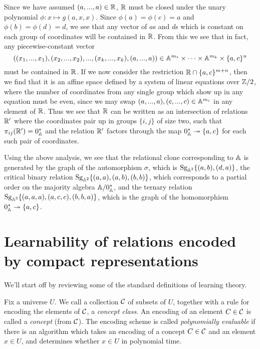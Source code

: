 \documentclass[letterpaper,11pt]{article}
\DeclareMathOperator{\Sg}{Sg}
\begin{document}
\begin{ex}
Since we have assumed $(a,...,a) \in \mathbb{R}$, $\mathbb{R}$ must be closed under the unary polynomial $\phi : x \mapsto g(a,x,x)$. Since $\phi(a) = \phi(c) = a$ and $\phi(b) = \phi(d) = d$, we see that any vector of $a$s and $d$s which is constant on each group of coordinates will be contained in $\mathbb{R}$. From this we see that in fact, any piecewise-constant vector
\[
((x_1,...,x_1),(x_2,...,x_2), ..., (x_k, ..., x_k), (a,...,a)) \in \mathbb{A}^{m_1} \times \cdots \times \mathbb{A}^{m_k} \times \{a,c\}^n
\]
must be contained in $\mathbb{R}$. If we now consider the restriction $\mathbb{R} \cap \{a,c\}^{m+n}$, then we find that it is an affine space defined by a system of linear equations over $\mathbb{Z}/2$, where the number of coordinates from any single group which show up in any equation must be even, since we may swap $(a,...,a),(c,...,c) \in \mathbb{A}^{m_i}$ in any element of $\mathbb{R}$. Thus we see that $\mathbb{R}$ can be written as an intersection of relations $\mathbb{R}'$ where the coordinates pair up in groups $\{i,j\}$ of size two, such that $\pi_{ij}(\mathbb{R}') = 0^*_{\mathbb{A}}$ and the relation $\mathbb{R}'$ factors through the map $0^*_{\mathbb{A}} \twoheadrightarrow \{a,c\}$ for each such pair of coordinates.

Using the above analysis, we see that the relational clone corresponding to $\mathbb{A}$ is generated by the graph of the automorphism $\sigma$, which is $\Sg_{\bA^2}\{(a,b),(d,a)\}$, the critical binary relation $\Sg_{\bA^2}\{(a,a),(a,b),(b,b)\}$, which corresponds to a partial order on the majority algebra $\mathbb{A}/0^*_{\mathbb{A}}$, and the ternary relation $\Sg_{\bA^3}\{(a,a,a),(a,c,c),(b,b,a)\}$, which is the graph of the homomorphism $0^*_{\mathbb{A}} \twoheadrightarrow \{a,c\}$.
\end{ex}


\section{Learnability of relations encoded by compact representations}%

We'll start off by reviewing some of the standard definitions of learning theory.

\begin{defn} Fix a universe $U$. We call a collection $\mathcal{C}$ of subsets of $U$, together with a rule for encoding the elements of $\mathcal{C}$, a \emph{concept class}. An encoding of an element $C \in \mathcal{C}$ is called a \emph{concept} (from $\mathcal{C}$). The encoding scheme is called \emph{polynomially evaluable} if there is an algorithm which takes an encoding of a concept $C \in \mathcal{C}$ and an element $x \in U$, and determines whether $x \in U$ in polynomial time.
\end{defn}
\end{document}
